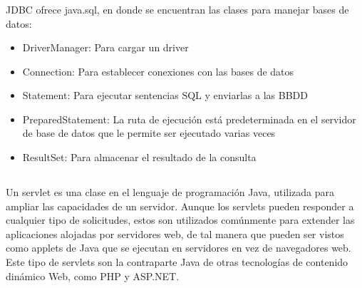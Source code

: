 \documentclass[10pt,a4paper]{article}
\begin{document}
\subsubsection{\color{colorESCOM}{Paquete}}
JDBC ofrece java.sql, en donde se encuentran las clases para manejar bases de datos:
\begin{itemize}
    \item DriverManager: Para cargar un driver
    \item Connection: Para establecer conexiones con las bases de datos
    \item Statement: Para ejecutar sentencias SQL y enviarlas a las BBDD
    \item PreparedStatement: La ruta de ejecución está predeterminada en el servidor de base de datos que le permite ser ejecutado varias veces
    \item ResultSet: Para almacenar el resultado de la consulta
\end{itemize}

\subsection{\color{colorESCOM}{Servlets}}
Un servlet es una clase en el lenguaje de programación Java, utilizada para ampliar las capacidades de un servidor. Aunque los servlets pueden responder a cualquier tipo de solicitudes, estos son utilizados comúnmente para extender las aplicaciones alojadas por servidores web, de tal manera que pueden ser vistos como applets de Java que se ejecutan en servidores en vez de navegadores web. Este tipo de servlets son la contraparte Java de otras tecnologías de contenido dinámico Web, como PHP y ASP.NET.
\end{document}
